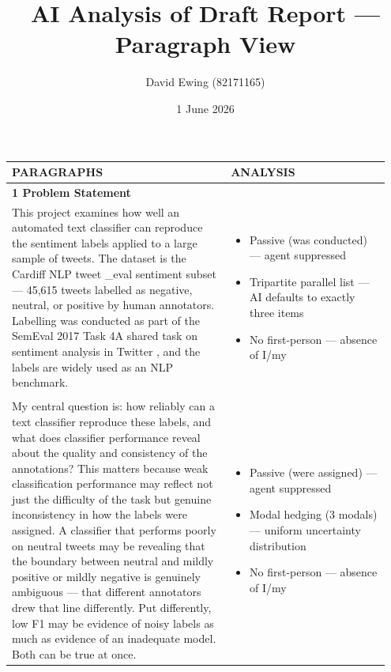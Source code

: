 \documentclass[11pt]{article}
\title{AI Analysis of Draft Report --- Paragraph View}
\author{David Ewing (82171165)}
\date{1 June 2026}
\begin{document}
\maketitle
\thispagestyle{empty}
\newpage

\setlength{\LTleft}{0pt}
\setlength{\LTright}{0pt}
\begin{longtable}{|p{0.55\linewidth}|p{0.40\linewidth}|}
\hline
\centering\textbf{PARAGRAPHS} & \centering\textbf{ANALYSIS} \tabularnewline[2pt]
\hline
\endhead
\textbf{1 Problem Statement}\\[4pt]
This project examines how well an automated text classifier can reproduce the sentiment labels applied to a large sample of tweets. The dataset is the Cardiff NLP tweet \_eval sentiment subset --- 45,615 tweets labelled as negative, neutral, or positive by human annotators. Labelling was conducted as part of the SemEval 2017 Task 4A shared task on sentiment analysis in Twitter , and the labels are widely used as an NLP benchmark. & \begin{itemize}[leftmargin=1em,itemsep=1pt,topsep=1pt,parsep=0pt]
  \item Passive (was conducted) --- agent suppressed
  \item Tripartite parallel list --- AI defaults to exactly three items
  \item No first-person --- absence of I/my
\end{itemize} \\[2pt]
\hline
\rule[-3.5cm]{0pt}{3.5cm} & \\
\hline
My central question is: how reliably can a text classifier reproduce these labels, and what does classifier performance reveal about the quality and consistency of the annotations? This matters because weak classification performance may reflect not just the difficulty of the task but genuine inconsistency in how the labels were assigned. A classifier that performs poorly on neutral tweets may be revealing that the boundary between neutral and mildly positive or mildly negative is genuinely ambiguous --- that different annotators drew that line differently. Put differently, low F1 may be evidence of noisy labels as much as evidence of an inadequate model. Both can be true at once. & \begin{itemize}[leftmargin=1em,itemsep=1pt,topsep=1pt,parsep=0pt]
  \item Passive (were assigned) --- agent suppressed
  \item Modal hedging (3 modals) --- uniform uncertainty distribution
  \item No first-person --- absence of I/my

\end{itemize}
\end{longtable}
\end{document}
